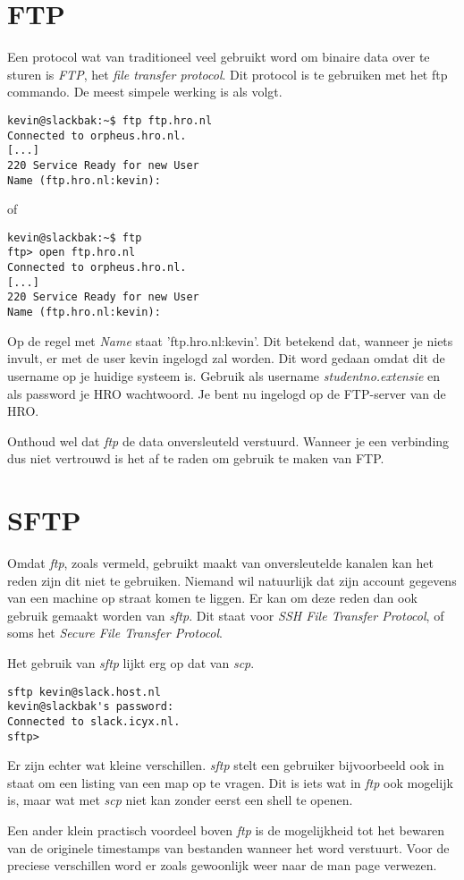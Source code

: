 \section{FTP}
Een protocol wat van traditioneel veel gebruikt word om binaire data over te sturen is \emph{FTP}, het \emph{file transfer protocol}. Dit protocol is te gebruiken met het ftp commando. De meest simpele werking is als volgt.
\begin{lstlisting}
kevin@slackbak:~$ ftp ftp.hro.nl
Connected to orpheus.hro.nl.
[...]
220 Service Ready for new User
Name (ftp.hro.nl:kevin): 
\end{lstlisting}%
of
\begin{lstlisting}
kevin@slackbak:~$ ftp
ftp> open ftp.hro.nl
Connected to orpheus.hro.nl.
[...]
220 Service Ready for new User
Name (ftp.hro.nl:kevin):
\end{lstlisting}%
Op de regel met \emph{Name} staat 'ftp.hro.nl:kevin'. Dit betekend dat, wanneer je niets invult, er met de user kevin ingelogd zal worden. Dit word gedaan omdat dit de username op je huidige systeem is. 
Gebruik als username \emph{studentno.extensie} en als password je HRO wachtwoord. Je bent nu ingelogd op de FTP-server van de HRO.

Onthoud wel dat \emph{ftp} de data onversleuteld verstuurd. Wanneer je een verbinding dus niet vertrouwd is het af te raden om gebruik te maken van FTP. 

\section{SFTP}
Omdat \emph{ftp}, zoals vermeld, gebruikt maakt van onversleutelde kanalen kan het reden zijn dit niet te gebruiken. Niemand wil natuurlijk dat zijn account gegevens van een machine op straat komen te liggen. Er kan om deze reden dan ook gebruik gemaakt worden van \emph{sftp}. Dit staat voor \emph{SSH File Transfer Protocol}, of soms het \emph{Secure File Transfer Protocol}. 

Het gebruik van \emph{sftp} lijkt erg op dat van \emph{scp}. 
\begin{lstlisting}
sftp kevin@slack.host.nl
kevin@slackbak's password: 
Connected to slack.icyx.nl.
sftp>
\end{lstlisting}
Er zijn echter wat kleine verschillen. \emph{sftp} stelt een gebruiker bijvoorbeeld ook in staat om een listing van een map op te vragen. Dit is iets wat in \emph{ftp} ook mogelijk is, maar wat met \emph{scp} niet kan zonder eerst een shell te openen. 

Een ander klein practisch voordeel boven \emph{ftp} is de mogelijkheid tot het bewaren van de originele timestamps van bestanden wanneer het word verstuurt. Voor de preciese verschillen word er zoals gewoonlijk weer naar de man page verwezen. 
